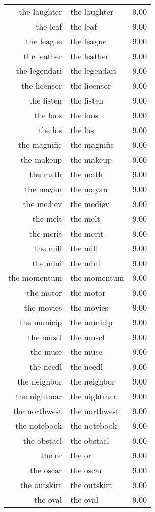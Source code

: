 \begin{table}[ht]
\begin{tabular}{rlr}
  the laughter & the laughter & 9.00 \\ 
  the leaf & the leaf & 9.00 \\ 
  the league & the league & 9.00 \\ 
  the leather & the leather & 9.00 \\ 
  the legendari & the legendari & 9.00 \\ 
  the licensor & the licensor & 9.00 \\ 
  the listen & the listen & 9.00 \\ 
  the loos & the loos & 9.00 \\ 
  the los & the los & 9.00 \\ 
  the magnific & the magnific & 9.00 \\ 
  the makeup & the makeup & 9.00 \\ 
  the math & the math & 9.00 \\ 
  the mayan & the mayan & 9.00 \\ 
  the mediev & the mediev & 9.00 \\ 
  the melt & the melt & 9.00 \\ 
  the merit & the merit & 9.00 \\ 
  the mill & the mill & 9.00 \\ 
  the mini & the mini & 9.00 \\ 
  the momentum & the momentum & 9.00 \\ 
  the motor & the motor & 9.00 \\ 
  the movies & the movies & 9.00 \\ 
  the municip & the municip & 9.00 \\ 
  the muscl & the muscl & 9.00 \\ 
  the muse & the muse & 9.00 \\ 
  the needl & the needl & 9.00 \\ 
  the neighbor & the neighbor & 9.00 \\ 
  the nightmar & the nightmar & 9.00 \\ 
  the northwest & the northwest & 9.00 \\ 
  the notebook & the notebook & 9.00 \\ 
  the obstacl & the obstacl & 9.00 \\ 
  the or & the or & 9.00 \\ 
  the oscar & the oscar & 9.00 \\ 
  the outskirt & the outskirt & 9.00 \\ 
  the oval & the oval & 9.00 \\ 

\end{tabular}
\end{table}
